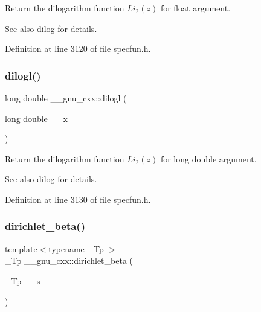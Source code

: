 Return the dilogarithm function $ Li_2(z) $ for {\ttfamily float} argument.

\begin{DoxySeeAlso}{See also}
\hyperlink{group__gnu__math__spec__func_ga4185ee1a0f9189a18085f65d52b6bc9b}{dilog} for details. 
\end{DoxySeeAlso}


Definition at line 3120 of file specfun.\+h.

\mbox{\label{group__gnu__math__spec__func_gae90c13ee690ebaf10a18a900fe2646f9}} 
\subsubsection{\texorpdfstring{dilogl()}{dilogl()}}
{\footnotesize\ttfamily long double \+\_\+\+\_\+gnu\+\_\+cxx\+::dilogl (\begin{DoxyParamCaption}\item[{long double}]{\+\_\+\+\_\+x }\end{DoxyParamCaption})\hspace{0.3cm}{\ttfamily [inline]}}

Return the dilogarithm function $ Li_2(z) $ for {\ttfamily long double} argument.

\begin{DoxySeeAlso}{See also}
\hyperlink{group__gnu__math__spec__func_ga4185ee1a0f9189a18085f65d52b6bc9b}{dilog} for details. 
\end{DoxySeeAlso}


Definition at line 3130 of file specfun.\+h.

\mbox{\label{group__gnu__math__spec__func_ga87466a2d429a2815d794acc21c882b08}} 
\subsubsection{\texorpdfstring{dirichlet\+\_\+beta()}{dirichlet\_beta()}}
{\footnotesize\ttfamily template$<$typename \+\_\+\+Tp $>$ \\
\+\_\+\+Tp \+\_\+\+\_\+gnu\+\_\+cxx\+::dirichlet\+\_\+beta (\begin{DoxyParamCaption}\item[{\+\_\+\+Tp}]{\+\_\+\+\_\+s }\end{DoxyParamCaption})\hspace{0.3cm}{\ttfamily [inline]}}

